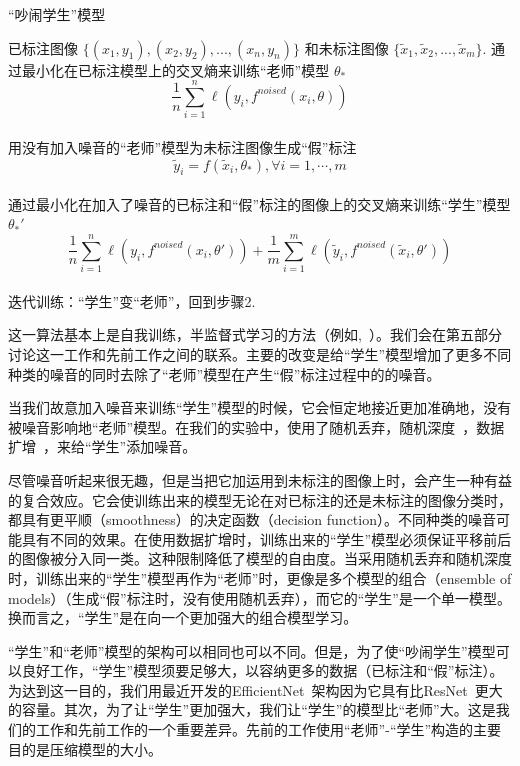 \documentclass[10pt]{article}
\begin{document}
\begin{algorithm}
	\small
	\caption{“吵闹学生”模型}
	\label{algo:noisy_student}
	\begin{algorithmic}[1]
		\REQUIRE 
		已标注图像 $\{(x_1, y_1), (x_2, y_2), ..., (x_n, y_n)\}$ 和未标注图像 $\{\tilde{x}_1, \tilde{x}_2, ..., \tilde{x}_m\}$.
		\STATE  通过最小化在已标注模型上的交叉熵来训练“老师”模型 $\theta_{*}$  $$\frac{1}{n}\sum_{i = 1}^n \ell(y_i, f^{noised}(x_i, \theta) )$$ \\ 
		\STATE 用没有加入噪音的“老师”模型为未标注图像生成“假”标注 $$\tilde{y}_i = f(\tilde{x}_i, \theta_{*}), \forall i = 1, \cdots, m $$ \\
		\STATE 通过最小化在加入了噪音的已标注和“假”标注的图像上的交叉熵来训练“学生”模型 $\theta_*'$ $$\frac{1}{n}\sum_{i=1}^n \ell(y_i, f^{noised}(x_i, \theta') ) + \frac{1}{m} \sum_{i=1}^m \ell (\tilde{y}_i, f^{noised}(\tilde{x}_i, \theta')) $$\\
		\STATE 迭代训练：“学生”变“老师”，回到步骤2.
		
	\end{algorithmic}
\end{algorithm}

这一算法基本上是自我训练，半监督式学习的方法（例如,~\cite{scudder1965probability,yarowsky1995unsupervised}）。我们会在第五部分讨论这一工作和先前工作之间的联系。主要的改变是给“学生”模型增加了更多不同种类的噪音的同时去除了“老师”模型在产生“假”标注过程中的的噪音。  


当我们故意加入噪音来训练“学生”模型的时候，它会恒定地接近更加准确地，没有被噪音影响地“老师”模型。在我们的实验中，使用了随机丢弃\cite{srivastava2014dropout}，随机深度~\cite{huang2016deep}，数据扩增~\cite{cubuk2019RandAugment}，来给“学生”添加噪音。  


尽管噪音听起来很无趣，但是当把它加运用到未标注的图像上时，会产生一种有益的复合效应。它会使训练出来的模型无论在对已标注的还是未标注的图像分类时，都具有更平顺（smoothness）的决定函数（decision function）。不同种类的噪音可能具有不同的效果。在使用数据扩增时，训练出来的“学生”模型必须保证平移前后的图像被分入同一类。这种限制降低了模型的自由度。当采用随机丢弃和随机深度时，训练出来的“学生”模型再作为“老师”时，更像是多个模型的组合（ensemble of models）（生成“假”标注时，没有使用随机丢弃），而它的“学生”是一个单一模型。换而言之，“学生”是在向一个更加强大的组合模型学习。  


“学生”和“老师”模型的架构可以相同也可以不同。但是，为了使“吵闹学生”模型可以良好工作，“学生”模型须要足够大，以容纳更多的数据（已标注和“假”标注）。为达到这一目的，我们用最近开发的EfficientNet~\cite{tan2019efficientnet}架构因为它具有比ResNet~\cite{he2016deep}更大的容量。其次，为了让“学生”更加强大，我们让“学生”的模型比“老师”大。这是我们的工作和先前工作的一个重要差异。先前的工作使用“老师”-“学生”构造的主要目的是压缩模型的大小。  
\end{document}
